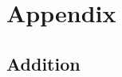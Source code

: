 \chapter{Appendix}
\pagestyle{scrheadings}	
\setcounter{page}{0}
\label{chp_appendix}
\section{Addition}


